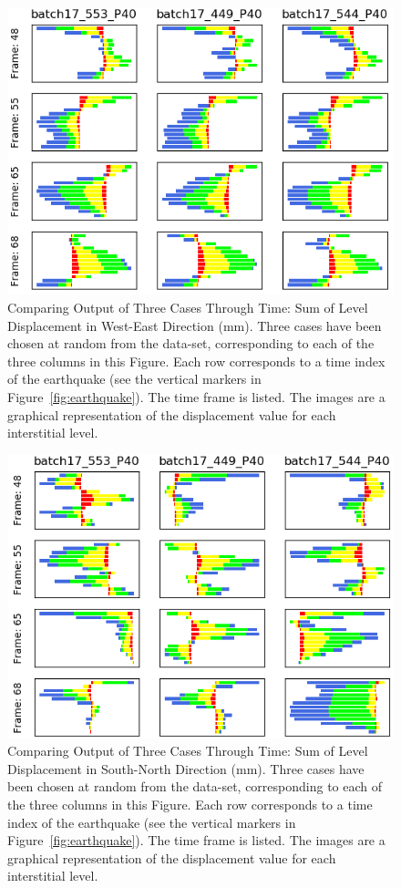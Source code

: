 \begin{figure}[p]
	\centering
	\includegraphics[scale=0.6]{Figures/level_results1.png}
	\caption{Comparing Output of Three Cases Through Time: Sum of Level Displacement in West-East Direction (mm). Three cases have been chosen at random from the data-set, corresponding to each of the three columns in this Figure. Each row corresponds to a time index of the earthquake (see the vertical markers in Figure~\ref{fig:earthquake}). The time frame is listed. The images are a graphical representation of the displacement value for each interstitial level.}
	\label{fig:levels1}
\end{figure}

\begin{figure}[p]
	\centering
	\includegraphics[scale=0.6]{Figures/level_results2.png}
	\caption{Comparing Output of Three Cases Through Time: Sum of Level Displacement in South-North Direction (mm). Three cases have been chosen at random from the data-set, corresponding to each of the three columns in this Figure. Each row corresponds to a time index of the earthquake (see the vertical markers in Figure~\ref{fig:earthquake}). The time frame is listed. The images are a graphical representation of the displacement value for each interstitial level.}
	\label{fig:levels2}
\end{figure}


